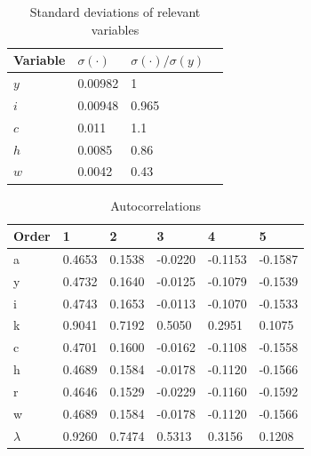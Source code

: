 \documentclass[10pt,letter]{article}
\begin{document}
\begin{table}[H]
	\centering
	\begin{tabular}{l|lll}
		Variable & $\sigma(\cdot)$ & $\sigma(\cdot)/\sigma(y)$ \\\hline
	$y$ & 0.00982 & 1     \\
	$i$ & 0.00948 & 0.965 \\
	$c$ & 0.011   & 1.1   \\
	$h$ & 0.0085  & 0.86  \\
	$w$ & 0.0042  & 0.43  
\end{tabular}
\caption{Standard deviations of relevant variables}
\end{table}
\begin{table}[H]
	\centering
	\begin{tabular}{l|lllll}
	Order  & 1      & 2      & 3       & 4       & 5       \\\hline
	a      & 0.4653 & 0.1538 & -0.0220 & -0.1153 & -0.1587 \\
	y      & 0.4732 & 0.1640 & -0.0125 & -0.1079 & -0.1539 \\
	i      & 0.4743 & 0.1653 & -0.0113 & -0.1070 & -0.1533 \\
	k      & 0.9041 & 0.7192 & 0.5050  & 0.2951  & 0.1075  \\
	c      & 0.4701 & 0.1600 & -0.0162 & -0.1108 & -0.1558 \\
	h      & 0.4689 & 0.1584 & -0.0178 & -0.1120 & -0.1566 \\
	r      & 0.4646 & 0.1529 & -0.0229 & -0.1160 & -0.1592 \\
	w      & 0.4689 & 0.1584 & -0.0178 & -0.1120 & -0.1566 \\
	$\lambda$ & 0.9260 & 0.7474 & 0.5313  & 0.3156  & 0.1208 
	\end{tabular}
	\caption{Autocorrelations}
\end{table}
\end{document}
